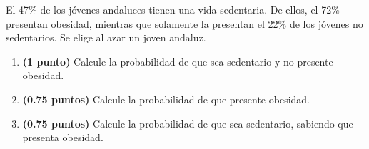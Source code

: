 
El 47\% de los jóvenes andaluces tienen una vida sedentaria. De ellos, el 72\% presentan obesidad, mientras que solamente la presentan el 22\% de los jóvenes no sedentarios. Se elige al azar un joven andaluz.
\begin{enumerate}[label=\alph*)]
\item \textbf{(1 punto)} Calcule la probabilidad de que sea sedentario y no presente obesidad.
\item \textbf{(0.75 puntos)} Calcule la probabilidad de que presente obesidad.
\item \textbf{(0.75 puntos)} Calcule la probabilidad de que sea sedentario, sabiendo que presenta obesidad.
\end{enumerate}
